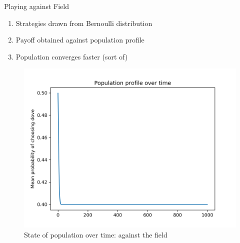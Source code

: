 \documentclass{IFES-beamer}
\begin{document}
                
        \begin{frame}{Playing against Field}
            \begin{enumerate}
                \item Strategies drawn from Bernoulli distribution
                \item Payoff obtained against population profile
                \item Population converges faster (sort of)
            \end{enumerate}
                \begin{figure}[H]
                \centering
                \includegraphics[scale=0.4]{Images/pop_profile_field.png}
                \caption{State of population over time: against the field}
                \label{fig:GD}
            \end{figure}
        \end{frame}
        
    
    
\end{document}
